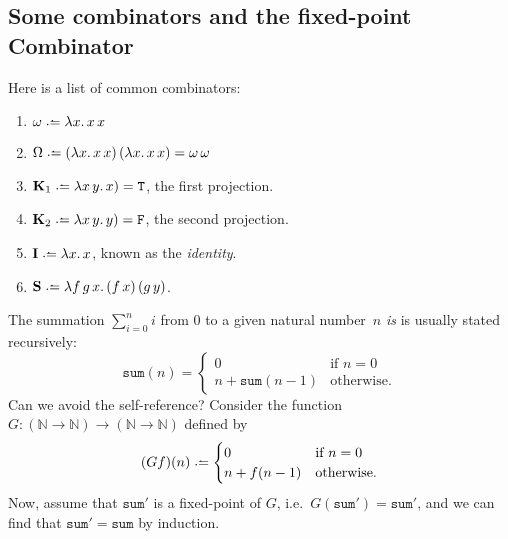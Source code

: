 \subsection{Some combinators and the fixed-point Combinator}
Here is a list of common combinators:
\begin{enumerate}
  \item $\omega \defeq \lambda x.\, x\,x$
  \item $\Omega \defeq (\lambda x.\, x\,x)\,(\lambda x.\,x\,x)
    = \omega\,\omega$
  \item $\mathbf{K}_1 \defeq \lambda x\,y.\, x) = \mathtt{T}$, the first projection.
  \item $\mathbf{K}_2 \defeq \lambda x\,y.\, y) = \mathtt{F}$, the second projection.
  \item $\mathbf{I} \defeq \lambda x.\, x$, known as the \emph{identity}.
  \item $\mathbf{S}\defeq\lambda f\,g\,x.\, 
    (f\,x)\,(g\,y)$.
\end{enumerate}
\begin{example}
  The summation $\sum_{i = 0}^{n} i$ from $0$ to a given natural number~$n$
  \emph{is} is usually stated recursively:
  \[
    \mathtt{sum}(n) =
      \begin{cases} 
       0 & \text{if } n = 0 \\
       n + \mathtt{sum}(n - 1)  & \text{otherwise}.
      \end{cases}
  \]
  Can we avoid the self-reference? Consider the function
  $G\colon (\mathbb{N} \to \mathbb{N}) \to (\mathbb{N} \to \mathbb{N})$
  defined by
  \begin{equation} \label{eq:summation}
    (Gf)(n) \defeq
    \begin{cases}
       0 & \text{if } n = 0 \\
       n + f(n - 1)  & \text{otherwise}.
    \end{cases}
  \end{equation}
  Now, assume that $\mathtt{sum}'$ is a fixed-point of $G$, i.e.\
  $G(\mathtt{sum}') =\mathtt{sum}'$, and we can find that $\mathtt{sum}' =
  \mathtt{sum}$ by induction. 
\end{example}

